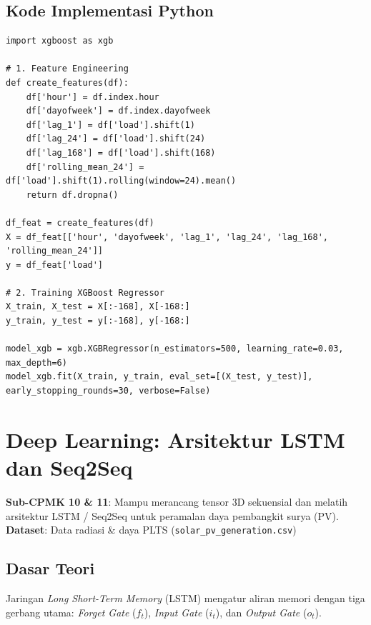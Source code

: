 \documentclass[11pt,a4paper]{report}
\begin{document}
\section{Kode Implementasi Python}
\begin{lstlisting}
import xgboost as xgb

# 1. Feature Engineering
def create_features(df):
    df['hour'] = df.index.hour
    df['dayofweek'] = df.index.dayofweek
    df['lag_1'] = df['load'].shift(1)
    df['lag_24'] = df['load'].shift(24)
    df['lag_168'] = df['load'].shift(168)
    df['rolling_mean_24'] = df['load'].shift(1).rolling(window=24).mean()
    return df.dropna()

df_feat = create_features(df)
X = df_feat[['hour', 'dayofweek', 'lag_1', 'lag_24', 'lag_168', 'rolling_mean_24']]
y = df_feat['load']

# 2. Training XGBoost Regressor
X_train, X_test = X[:-168], X[-168:]
y_train, y_test = y[:-168], y[-168:]

model_xgb = xgb.XGBRegressor(n_estimators=500, learning_rate=0.03, max_depth=6)
model_xgb.fit(X_train, y_train, eval_set=[(X_test, y_test)], early_stopping_rounds=30, verbose=False)
\end{lstlisting}

\newpage

\chapter{Deep Learning: Arsitektur LSTM dan Seq2Seq}

\begin{tcolorbox}[title=Informasi Modul 10 \& 11]
\textbf{Sub-CPMK 10 \& 11}: Mampu merancang tensor 3D sekuensial dan melatih arsitektur LSTM / Seq2Seq untuk peramalan daya pembangkit surya (PV).\\
\textbf{Dataset}: Data radiasi \& daya PLTS (\texttt{solar\_pv\_generation.csv})
\end{tcolorbox}

\section{Dasar Teori}
Jaringan \textit{Long Short-Term Memory} (LSTM) mengatur aliran memori dengan tiga gerbang utama: \textit{Forget Gate} ($f_t$), \textit{Input Gate} ($i_t$), dan \textit{Output Gate} ($o_t$).
\end{document}

